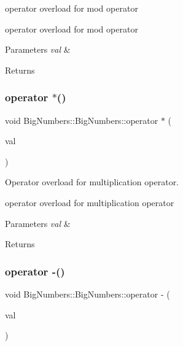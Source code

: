 operator overload for mod operator 

operator overload for mod operator


\begin{DoxyParams}{Parameters}
{\em val} & \\
\hline
\end{DoxyParams}
\begin{DoxyReturn}{Returns}

\end{DoxyReturn}
\mbox{\label{class_big_numbers_1_1_big_numbers_af6a504d7e4222d7f40484cdf178b725e}} 
\subsubsection{\texorpdfstring{operator $\ast$()}{operator *()}}
{\footnotesize\ttfamily void Big\+Numbers\+::\+Big\+Numbers\+::operator $\ast$ (\begin{DoxyParamCaption}\item[{\mbox{\hyperlink{class_big_numbers_1_1_big_numbers}{Big\+Numbers}} \&}]{val }\end{DoxyParamCaption})}



Operator overload for multiplication operator. 

operator overload for multiplication operator


\begin{DoxyParams}{Parameters}
{\em val} & \\
\hline
\end{DoxyParams}
\begin{DoxyReturn}{Returns}

\end{DoxyReturn}
\mbox{\label{class_big_numbers_1_1_big_numbers_a3a11a7f18fd3983fb9e2cea2d0a339a4}} 
\subsubsection{\texorpdfstring{operator -\/()}{operator -()}}
{\footnotesize\ttfamily void Big\+Numbers\+::\+Big\+Numbers\+::operator -\/ (\begin{DoxyParamCaption}\item[{\mbox{\hyperlink{class_big_numbers_1_1_big_numbers}{Big\+Numbers}} \&}]{val }\end{DoxyParamCaption})}

